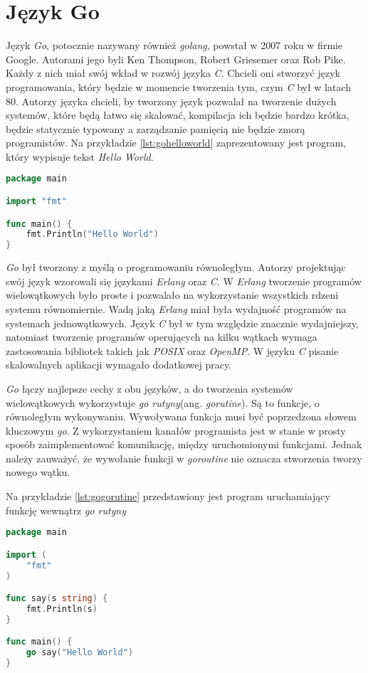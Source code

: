 \section{Język Go}
Język \textsl{Go}, potocznie nazywany również \textsl{golang}, powstał w 2007 roku w firmie Google. Autorami jego byli Ken Thompson, Robert Griesemer oraz Rob Pike\cite{programmingingo}. Każdy z nich miał swój wkład w rozwój języka \textsl{C}. Chcieli oni stworzyć język programowania, który będzie w momencie tworzenia tym, czym \textsl{C} był w latach 80. Autorzy języka chcieli, by tworzony język pozwalał na tworzenie dużych systemów, które będą łatwo się skalować, kompilacja ich będzie bardzo krótka, będzie statycznie typowany a zarządzanie pamięcią nie będzie zmorą programistów. Na przykładzie \ref{lst:gohelloworld} zaprezentowany jest program, który wypisuje tekst \textsl{Hello World}.
\begin{lstlisting}[language=Go, caption={Przykład programu w języku Go}, label={lst:gohelloworld}]
package main

import "fmt"

func main() {
	fmt.Println("Hello World")
}
\end{lstlisting}

\textsl{Go} był tworzony z myślą o programowaniu równoległym. Autorzy projektując swój język wzorowali się językami \textsl{Erlang} oraz \textsl{C}. W \textsl{Erlang} tworzenie programów wielowątkowych było proste i pozwalało na wykorzystanie wszystkich rdzeni systemu równomiernie. Wadą jaką \textsl{Erlang} miał była wydajność programów na systemach jednowątkowych. Język \textsl{C} był w tym względzie znacznie wydajniejszy, natomiast tworzenie programów operujących na kilku wątkach wymaga zastosowania bibliotek takich jak \textsl{POSIX} oraz \textsl{OpenMP}. W języku \textsl{C} pisanie skalowalnych aplikacji wymagało dodatkowej pracy.

\textsl{Go} łączy najlepsze cechy z obu języków, a do tworzenia systemów wielowątkowych wykorzystuje \textsl{go rutyny}(ang. \textsl{gorutine})\cite{gophrasebook}. Są to funkcje, o równoległym wykonywaniu. Wywoływana funkcja musi być poprzedzona słowem kluczowym \textsl{go}. Z wykorzystaniem kanałów programista jest w stanie w prosty sposób zaimplementować komunikację, między uruchomionymi funkcjami. Jednak należy zauważyć, że wywołanie funkcji w \textsl{goroutine} nie oznacza stworzenia tworzy nowego wątku. 

Na przykładzie \ref{lst:gogorutine} przedstawiony jest program uruchamiający funkcję wewnątrz \textsl{go rutyny}
\begin{lstlisting}[language=Go, caption={Przykładowy program w Go uruchamiający funkcję w oddzielnym wątku}, label={lst:gogorutine}]
package main

import (
	"fmt"
)

func say(s string) {
	fmt.Println(s)
}

func main() {
	go say("Hello World")
}
\end{lstlisting}



